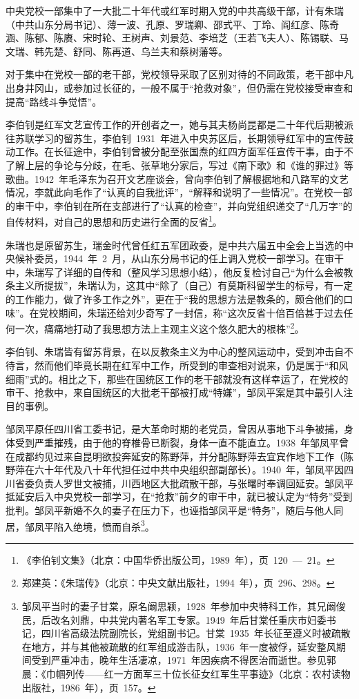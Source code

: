 中央党校一部集中了一大批二十年代或红军时期入党的中共高级干部，计有朱瑞（中共山东分局书记）、薄一波、孔原、罗瑞卿、邵式平、丁玲、阎红彦、陈奇涵、陈郁、陈赓、宋时轮、王树声、刘景范、李培芝（王若飞夫人）、陈锡联、马文瑞、韩先楚、舒同、陈再道、乌兰夫和蔡树藩等。

对于集中在党校一部的老干部，党校领导采取了区别对待的不同政策，老干部中凡出身井冈山，或参加过长征的，一般不属于“抢救对象”，但仍需在党校接受审查和提高“路线斗争觉悟”。

李伯钊是红军文艺宣传工作的开创者之一，她与其夫杨尚昆都是二十年代后期被派往苏联学习的留苏生，李伯钊~1931~年进入中央苏区后，长期领导红军中的宣传鼓动工作。在长征途中，李伯钊曾被分配至张国焘的红四方面军任宣传干事，由于不了解上层的争论与分歧，在毛、张草地分家后，写过《南下歌》和《谁的罪过》等歌曲。1942~年毛泽东为召开文艺座谈会，曾向李伯钊了解根据地和八路军的文艺情况，李就此向毛作了“认真的自我批评”，“解释和说明了一些情况”。在党校一部的审干中，李伯钊在所在支部进行了“认真的检查”，并向党组织递交了“几万字”的自传材料，对自己的思想和历史进行全面的反省\footnote{《李伯钊文集》（北京：中国华侨出版公司，1989~年），页~120~—~21。}。

朱瑞也是原留苏生，瑞金时代曾任红五军团政委，是中共六届五中全会上当选的中央候补委员，1944~年~2~月，从山东分局书记的任上调入党校一部学习。在审干中，朱瑞写了详细的自传和（整风学习思想小结），他反复检讨自己“为什么会被教条主义所提拔”，朱瑞认为，这其中“除了（自己）有莫斯科留学生的标号，有一定的工作能力，做了许多工作之外”，更在于“我的思想方法是教条的，颇合他们的口味”。在党校期间，朱瑞还给刘少奇写了一封信，称“这次反省十倍百倍甚于过去任何一次，痛痛地打动了我思想方法上主观主义这个悠久肥大的根株”\footnote{郑建英：《朱瑞传》（北京：中央文献出版社，1994~年），页~296、298。}。

李伯钊、朱瑞皆有留苏背景，在以反教条主义为中心的整风运动中，受到冲击自不待言，然而他们毕竟长期在红军中工作，所受到的审查相对说来，仍是属于“和风细雨”式的。相比之下，那些在国统区工作的老干部就没有这样幸运了，在党校的审干、抢救中，来自国统区的大批老干部被打成“特嫌”，邹凤平案是其中最引人注目的事例。

邹凤平原任四川省工委书记，是大革命时期的老党员，曾因从事地下斗争被捕，身体受到严重摧残，由于他的脊椎骨已断裂，身体一直不能直立。1938~年邹凤平曾在成都约见过来自昆明欲投奔延安的陈野萍，并分配陈野萍去宜宾作地下工作（陈野萍在六十年代及八十年代担任过中共中央组织部副部长）。1940~年，邹凤平因四川省委负责人罗世文被捕，川西地区大批疏散干部，与张曙时奉调回延安。邹凤平抵延安后入中央党校一部学习，在“抢救”前夕的审干中，就已被认定为“特务”受到批判。邹凤平新婚不久的妻子在压力下，也诬指邹凤平是“特务”，随后与他人同居，邹凤平陷入绝境，愤而自杀\footnote{邹凤平当时的妻子甘棠，原名阚思颖，1928~年参加中央特科工作，其兄阚俊民，后改名刘鼎，中共党内著名军工专家。1949~年后甘棠任重庆市妇委书记，四川省高级法院副院长，党组副书记。甘棠~1935~年长征至遵义时被疏散在地方，并与其他被疏散的红军组成游击队，1936~年一度被俘，延安整风期间受到严重冲击，晚年生活凄凉，1971~年因疾病不得医治而逝世。参见郭晨：《巾帼列传——红一方面军三十位长征女红军生平事迹》（北京：农村读物出版社，1986~年），页~157。}。

